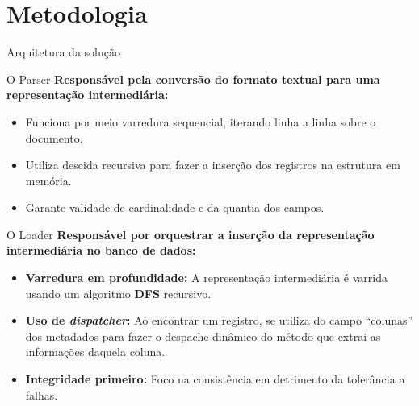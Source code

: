 \section{Metodologia}

\begin{frame}{Arquitetura da solução}

\end{frame}

\begin{frame}{O Parser}
  \textbf{Responsável pela conversão do formato textual para uma representação intermediária:}
  \begin{itemize}
    \item Funciona por meio varredura sequencial, iterando linha a linha sobre o documento.
    \item Utiliza descida recursiva para fazer a inserção dos registros na estrutura em memória.
    \item Garante validade de cardinalidade e da quantia dos campos.
  \end{itemize}
\end{frame}

\begin{frame}{O Loader}
  \textbf{Responsável por orquestrar a inserção da representação intermediária no banco de dados:}
  \begin{itemize}
    \item \textbf{Varredura em profundidade:} A representação intermediária é varrida usando um algoritmo \textbf{DFS} recursivo.
    \item \textbf{Uso de \textit{dispatcher}:} Ao encontrar um registro, se utiliza do campo ``colunas'' dos metadados para fazer o despache dinâmico do método que extrai as informações daquela coluna.
    \item \textbf{Integridade primeiro:} Foco na consistência em detrimento da tolerância a falhas.
  \end{itemize}
\end{frame}
